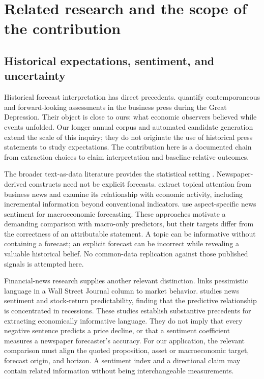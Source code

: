 \section{Related research and the scope of the contribution}
\subsection{Historical expectations, sentiment, and uncertainty}
Historical forecast interpretation has direct precedents. \citet{mathy2017} quantify contemporaneous and forward-looking assessments in the business press during the Great Depression. Their object is close to ours: what economic observers believed while events unfolded. Our longer annual corpus and automated candidate generation extend the scale of this inquiry; they do not originate the use of historical press statements to study expectations. The contribution here is a documented chain from extraction choices to claim interpretation and baseline-relative outcomes.

The broader text-as-data literature provides the statistical setting \citep{gentzkow2019}. Newspaper-derived constructs need not be explicit forecasts. \citet{bybee2024} extract topical attention from business news and examine its relationship with economic activity, including incremental information beyond conventional indicators. \citet{barbaglia2022} use aspect-specific news sentiment for macroeconomic forecasting. These approaches motivate a demanding comparison with macro-only predictors, but their targets differ from the correctness of an attributable statement. A topic can be informative without containing a forecast; an explicit forecast can be incorrect while revealing a valuable historical belief. No common-data replication against those published signals is attempted here.

Financial-news research supplies another relevant distinction. \citet{tetlock2007} links pessimistic language in a Wall Street Journal column to market behavior. \citet{garcia2013} studies news sentiment and stock-return predictability, finding that the predictive relationship is concentrated in recessions. These studies establish substantive precedents for extracting economically informative language. They do not imply that every negative sentence predicts a price decline, or that a sentiment coefficient measures a newspaper forecaster's accuracy. For our application, the relevant comparison must align the quoted proposition, asset or macroeconomic target, forecast origin, and horizon. A sentiment index and a directional claim may contain related information without being interchangeable measurements.

